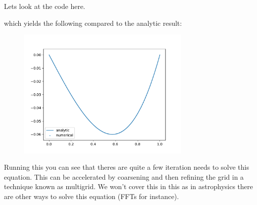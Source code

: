 Lets look at the code here.


which yields the following compared to the analytic result:
\begin{figure}
    \centering\includegraphics[width=0.75\textwidth]{code/relax.pdf}
    \caption{\label{fig:relax}}
\end{figure}

Running this you can see that theres are quite a few iteration needs to solve this equation. This can be accelerated by coarsening and then refining the grid in a technique known as multigrid. We won't cover this in this as in astrophysics there are other ways to solve this equation (FFTs for instance).